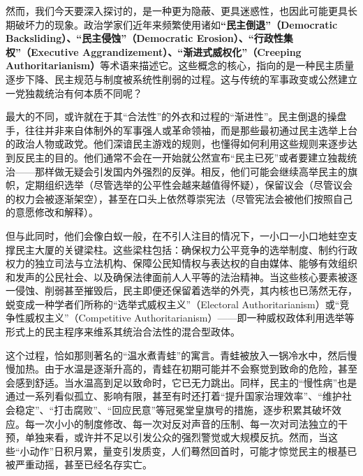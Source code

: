 \documentclass[UTF8, 10pt]{ctexbook}
\begin{document}
然而，我们今天要深入探讨的，是一种更为隐蔽、更具迷惑性，也因此可能更具长期破坏力的现象。政治学家们近年来频繁使用诸如\textbf{“民主倒退”（Democratic Backsliding）、“民主侵蚀”（Democratic Erosion）、“行政性集权”（Executive Aggrandizement）、“渐进式威权化”（Creeping Authoritarianism）}等术语来描述它。这些概念的核心，指向的是一种民主质量逐步下降、民主规范与制度被系统性削弱的过程。这与传统的军事政变或公然建立一党独裁统治有何本质不同呢？

最大的不同，或许就在于其“合法性”的外衣和过程的“渐进性”。民主倒退的操盘手，往往并非来自体制外的军事强人或革命领袖，而是那些最初通过民主选举上台的政治人物或政党。他们深谙民主游戏的规则，也懂得如何利用这些规则来逐步达到反民主的目的。他们通常不会在一开始就公然宣布“民主已死”或者要建立独裁统治——那样做无疑会引发国内外强烈的反弹。相反，他们可能会继续高举民主的旗帜，定期组织选举（尽管选举的公平性会越来越值得怀疑），保留议会（尽管议会的权力会被逐渐架空），甚至在口头上依然尊崇宪法（尽管宪法会被他们按照自己的意愿修改和解释）。

但与此同时，他们会像白蚁一般，在不引人注目的情况下，一小口一小口地蛀空支撑民主大厦的关键梁柱。这些梁柱包括：确保权力公平竞争的选举制度、制约行政权力的独立司法与立法机构、保障公民知情权与表达权的自由媒体、能够有效组织和发声的公民社会、以及确保法律面前人人平等的法治精神。当这些核心要素被逐一侵蚀、削弱甚至摧毁后，民主即便还保留着选举的外壳，其内核也已荡然无存，蜕变成一种学者们所称的“选举式威权主义”（Electoral Authoritarianism）或“竞争性威权主义”（Competitive Authoritarianism）——即一种威权政体利用选举等形式上的民主程序来维系其统治合法性的混合型政体。

这个过程，恰如那则著名的“温水煮青蛙”的寓言。青蛙被放入一锅冷水中，然后慢慢加热。由于水温是逐渐升高的，青蛙在初期可能并不会察觉到致命的危险，甚至会感到舒适。当水温高到足以致命时，它已无力跳出。同样，民主的“慢性病”也是通过一系列看似孤立、影响有限，甚至有时还打着“提升国家治理效率”、“维护社会稳定”、“打击腐败”、“回应民意”等冠冕堂皇旗号的措施，逐步积累其破坏效应。每一次小小的制度修改、每一次对反对声音的压制、每一次对司法独立的干预，单独来看，或许并不足以引发公众的强烈警觉或大规模反抗。然而，当这些“小动作”日积月累，量变引发质变，人们蓦然回首时，可能才惊觉民主的根基已被严重动摇，甚至已经名存实亡。
\end{document}
